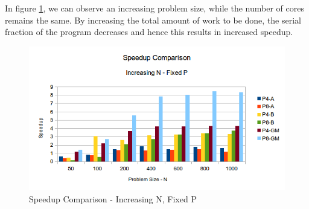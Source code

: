 \documentclass[conference]{IEEEtran}
\begin{document}
In figure \ref{pic:omp_speedup_comp2}, we can observe an increasing problem size, while the number of cores remains the same. By increasing the total amount of work to be done, the serial fraction of the program decreases and hence this results in increased speedup.

\begin{figure}[h]
  \centering
  \includegraphics[scale=0.55]{pic/omp_speedup2_comp.png} 
  \caption{Speedup Comparison - Increasing N, Fixed P}
  \label{pic:omp_speedup_comp2}
\end{figure}



%
%

\end{document}
